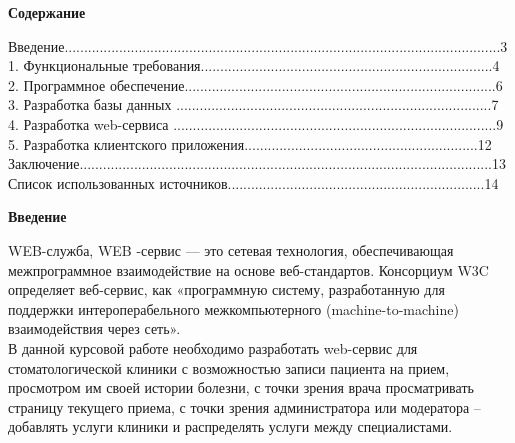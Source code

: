 \documentclass[a4paper]{article}
\begin{document}
\hfill \break
\hfill \break
\begin{center}
\Large{\textbf{Содержание}}\\
\end{center}
\normalsize{Введение................................................................................................................3}\\
\normalsize{1.  Функциональные требования...........................................................................4}\\
\normalsize{2. Программное обеспечение................................................................................6}\\
\normalsize{3. Разработка базы данных	.................................................................................7}\\
\normalsize{4. Разработка web-сервиса	...................................................................................9}\\
\normalsize{5. Разработка клиентского приложения............................................................12}\\
\normalsize{Заключение..........................................................................................................13}\\
\normalsize{Список использованных источников..................................................................14}\\


\newpage

\hfill \break
\hfill \break
\begin{center}
\Large{\textbf{Введение}}\\
\end{center}


\normalsize{WEB-служба, WEB -сервис — это сетевая технология, обеспечивающая межпрограммное взаимодействие на основе веб-стандартов. Консорциум W3C определяет веб-сервис, как «программную систему, разработанную для поддержки интероперабельного межкомпьютерного (machine-to-machine) взаимодействия через сеть».}\\


\normalsize{В данной курсовой работе необходимо разработать web-сервис для стоматологической клиники с возможностью записи пациента на прием, просмотром им своей истории болезни, с точки зрения врача просматривать страницу текущего приема, с точки зрения администратора или модератора – добавлять услуги клиники и распределять услуги между специалистами.
}\\
\end{document}
